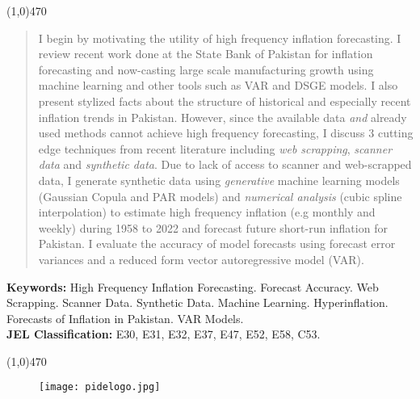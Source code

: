 \documentclass[12pt]{article}
\newcommand{\1}{\mathbbm 1}
\begin{document}
		\begin{center}
			\line(1,0){470}
		\end{center}
		\begin{spacing}{1.1}
			\vspace{-3ex}
			\begin{abstract}
				\noindent 
				I begin by motivating the utility of high frequency inflation forecasting. I review recent work done at the State Bank of Pakistan for inflation forecasting and now-casting large scale manufacturing growth using machine learning and other tools such as VAR and DSGE models. I also present stylized facts about the structure of historical and especially recent inflation trends in Pakistan. However, since the available data \textit{and} already used methods cannot achieve high frequency forecasting, I discuss $3$ cutting edge techniques from recent literature including \textit{web scrapping}, \textit{scanner data} and \textit{synthetic data}. Due to lack of access to scanner and web-scrapped data, I generate synthetic data using \textit{generative} machine learning models (Gaussian Copula and PAR models) and \textit{numerical analysis} (cubic spline interpolation) to estimate high frequency inflation (e.g monthly and weekly) during 1958 to 2022 and forecast future short-run inflation for Pakistan. I evaluate the accuracy of model forecasts using forecast error variances and a reduced form vector autoregressive model (VAR).
				
			\end{abstract}
		\end{spacing}
		\textbf{Keywords:} High Frequency Inflation Forecasting. Forecast Accuracy. Web Scrapping. Scanner Data. Synthetic Data. Machine Learning. Hyperinflation. Forecasts of Inflation in Pakistan. VAR Models. {}\\
		\textbf{JEL Classification:} E30, E31, E32, E37, E47, E52, E58, C53.
		\\
		\begin{center}
			\vspace{-8ex}
			\line(1,0){470}
		\end{center}
		\baselineskip=18pt 
		
		\newpage{}
		
		\begin{figure}[H]
			\begin{center}
				\texttt{[image: pidelogo.jpg]}		
				\caption*{}
			\end{center}
		\end{figure}
		
\end{document}
